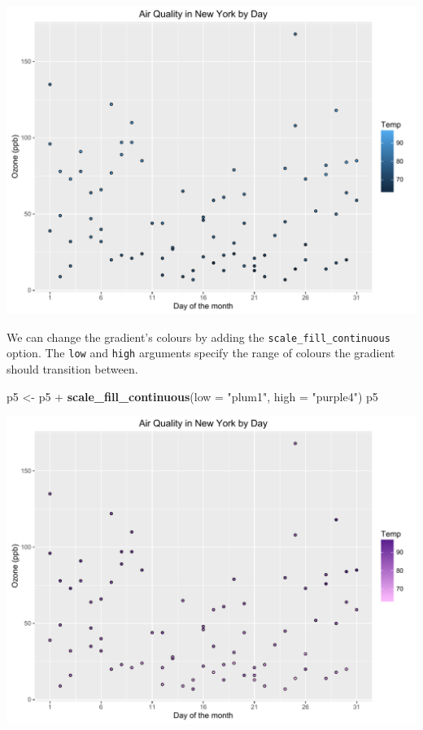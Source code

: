 \documentclass[]{article}
\newenvironment{Shaded}{\begin{snugshade}}{\end{snugshade}}
\newcommand{\KeywordTok}[1]{\textcolor[rgb]{0.13,0.29,0.53}{\textbf{{#1}}}}
\newcommand{\DataTypeTok}[1]{\textcolor[rgb]{0.13,0.29,0.53}{{#1}}}
\newcommand{\StringTok}[1]{\textcolor[rgb]{0.31,0.60,0.02}{{#1}}}
\newcommand{\NormalTok}[1]{{#1}}
\begin{document}
\begin{center}\includegraphics{0_all_posts_pdf/scatter_7-1} \end{center}

We can change the gradient's colours by adding the
\texttt{scale\_fill\_continuous} option. The \texttt{low} and
\texttt{high} arguments specify the range of colours the gradient should
transition between.

\begin{Shaded}
\begin{Highlighting}[]
\NormalTok{p5 <-}\StringTok{  }\NormalTok{p5 +}\StringTok{ }\KeywordTok{scale_fill_continuous}\NormalTok{(}\DataTypeTok{low =} \StringTok{"plum1"}\NormalTok{, }\DataTypeTok{high =} \StringTok{"purple4"}\NormalTok{)}
\NormalTok{p5}
\end{Highlighting}
\end{Shaded}

\begin{center}\includegraphics{0_all_posts_pdf/scatter_8-1} \end{center}
\end{document}
